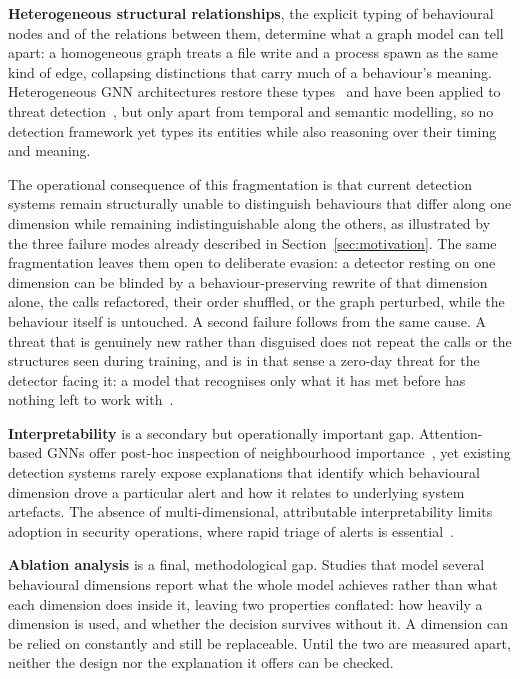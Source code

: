 \documentclass[%
    BCOR=10mm,
    DIV=13,
    toc=bibliography,
    toc=listof,
    oneside,
    12pt,
]{scrbook}
\begin{document}
\textbf{Heterogeneous structural relationships}, the explicit typing of behavioural
nodes and of the relations between them, determine what a graph model can tell apart:
a homogeneous graph treats a file write and a process spawn as the same kind of edge,
collapsing distinctions that carry much of a behaviour's meaning. Heterogeneous GNN
architectures restore these types~\cite{han2019, hetgnn2019} and have been applied to
threat detection~\cite{wang2019matchgnet, li2024imbalanced}, but only apart from
temporal and semantic modelling, so no detection framework yet types its entities
while also reasoning over their timing and meaning.

The operational consequence of this fragmentation is that current detection
systems remain structurally unable to distinguish behaviours that differ along
one dimension while remaining indistinguishable along the others, as
illustrated by the three failure modes already described in
Section~\ref{sec:motivation}. The same fragmentation leaves them open to
deliberate evasion: a detector resting on one dimension can be blinded by a
behaviour-preserving rewrite of that dimension alone, the calls refactored,
their order shuffled, or the graph perturbed, while the behaviour itself is
untouched. A second failure follows from the same cause. A threat that is
genuinely new rather than disguised does not repeat the calls or the structures
seen during training, and is in that sense a zero-day threat for the detector
facing it: a model that recognises only what it has met before has nothing left
to work with~\cite{guo2023zeroday}.

\textbf{Interpretability} is a secondary but operationally important gap.
Attention-based GNNs offer post-hoc inspection of
neighbourhood importance~\cite{velickovic2018gat, han2019}, yet existing
detection systems rarely expose explanations that identify which behavioural
dimension drove a particular alert and how it relates to underlying system
artefacts. The absence of multi-dimensional, attributable
interpretability limits adoption in security operations, where rapid triage
of alerts is essential~\cite{bilot2024survey}.

\textbf{Ablation analysis} is a final, methodological gap. Studies that model several
behavioural dimensions report what the whole model achieves rather than what each
dimension does inside it, leaving two properties conflated: how heavily a dimension
is used, and whether the decision survives without it. A dimension can be relied on
constantly and still be replaceable. Until the two are measured apart, neither the
design nor the explanation it offers can be checked.
\end{document}
